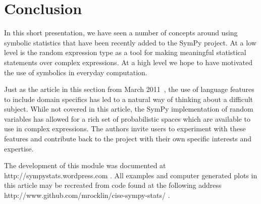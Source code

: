 \section{Conclusion}

In this short presentation, we have seen a number of concepts around using
symbolic statistics that have been recently added to the SymPy project.  At a
low level is the random expression type as a tool for making meaningful
statistical statements over complex expressions. At a high level we hope to
have motivated the use of symbolics in everyday computation.

Just as the article in this section from March
2011~\cite{Terrel2011}, the use of language features to include domain
specifics has led to a natural way of thinking about a difficult subject.
While not covered in this article, the SymPy implementation of random variables
has allowed for a rich set of probabilistic spaces which are available to use
in complex expressions.  The authors invite users to experiment with these
features and contribute back to the project with their own specific interests
and expertise.

The development of this module was documented at http://sympystats.wordpress.com . All examples and computer generated plots in this article may be recreated from code found at the following address http://www.github.com/mrocklin/cise-sympy-stats/ . 
